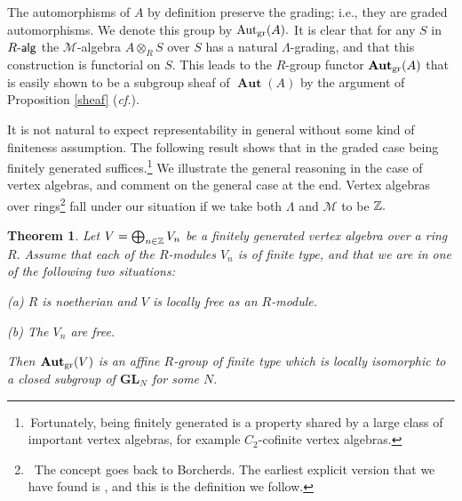 \documentclass{article}
\newtheorem{thm}{Theorem}
\theoremstyle{definition}
\def\Aut{\ensuremath{\operatorname{Aut}}}
\def\BAut{\ensuremath{\operatorname{\mathbf{Aut}}}}
\def\Ralg{\ensuremath{R\text{-\textup{\textsf{alg}}}}}
\def\BGL{\ensuremath{\mathbf{G}\mathbf{L}}}
\def\Mu{\ensuremath{\mathcal{M}}}
\begin{document}
The automorphisms of $A$ by definition  preserve the grading; i.e., they are graded automorphisms. We denote this group by $\Aut_{\rm gr}(A).$  It is clear that for any $S$ in $\Ralg$ the $\Mu$-algebra $A \otimes_R S$ over $S$ has a natural $\Lambda$-grading, and that this construction is functorial on $S.$ This leads to the $R$-group functor $\BAut_{\rm gr}(A)$ that is easily shown to be a subgroup sheaf of $\BAut(A)$ by the argument of Proposition \ref{sheaf} ({\it cf.}\@ \cite{MGP}). 

It is not natural to expect representability in general without some kind of finiteness assumption. The following result shows that in the graded case being finitely generated suffices.\footnote{\,Fortunately, being finitely generated is a property shared by a large class of important vertex algebras, for example $C_2$-cofinite vertex algebras.} We illustrate the general reasoning in the case of vertex algebras, and comment on the general case at the end.  Vertex algebras over rings\footnote{\, The concept goes back to Borcherds. The earliest explicit version that we have found is \cite{Griess}, and this is the definition we follow.}
 fall under our situation if we take both $\Lambda$ and $\Mu$ to be $\Bbb{Z}.$

 \begin{thm}\label{repgr} Let $V = \bigoplus_{n \in \Bbb{Z}} V_n$ be a  finitely generated vertex algebra over a ring $R.$ Assume  that each of  the $R$-modules  $V_n$ is of finite type, and that we are in one of the following two situations:

(a) $R$ is noetherian and $V$ is locally free as an $R$-module.

(b) The $V_n$ are free.  

\noindent Then  $\BAut_{\rm gr}(V)$ is an affine $R$-group of finite type which is  locally isomorphic to a closed subgroup of $\BGL_N$ for some $N.$ 
	\end{thm}
	
\end{document}
